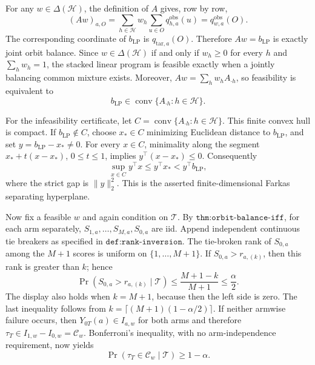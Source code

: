 For any \(w\in\Delta(\mathcal H)\), the definition of \(A\) gives, row by row, \[(Aw)_{a,O}=\sum_{h\in\mathcal H}w_h\sum_{u\in O}q^{\mathrm{obs}}_{h,a}(u)=q^{\mathrm{obs}}_{w,a}(O).\] The corresponding coordinate of \(b_{\mathrm{LP}}\) is \(q_{\mathrm{tar},a}(O)\). Therefore \(Aw=b_{\mathrm{LP}}\) is exactly joint orbit balance. Since \(w\in\Delta(\mathcal H)\) if and only if \(w_h\ge0\) for every \(h\) and \(\sum_h w_h=1\), the stacked linear program is feasible exactly when a jointly balancing common mixture exists. Moreover, \(Aw=\sum_h w_hA_{\cdot h}\), so feasibility is equivalent to \[b_{\mathrm{LP}}\in\operatorname{conv}\{A_{\cdot h}:h\in\mathcal H\}.\]

For the infeasibility certificate, let \(C=\operatorname{conv}\{A_{\cdot h}:h\in\mathcal H\}\). This finite convex hull is compact. If \(b_{\mathrm{LP}}\notin C\), choose \(x_*\in C\) minimizing Euclidean distance to \(b_{\mathrm{LP}}\), and set \(y=b_{\mathrm{LP}}-x_*\ne0\). For every \(x\in C\), minimality along the segment \(x_*+t(x-x_*)\), \(0\le t\le1\), implies \(y^\top(x-x_*)\le0\). Consequently \[\sup_{x\in C}y^\top x\le y^\top x_*<y^\top b_{\mathrm{LP}},\] where the strict gap is \(\lVert y\rVert_2^2\). This is the asserted finite-dimensional Farkas separating hyperplane.

Now fix a feasible \(w\) and again condition on \(\mathcal T\). By \(\texttt{thm:orbit-balance-iff}\), for each arm separately, \(S_{1,a},\ldots,S_{M,a},S_{0,a}\) are iid. Append independent continuous tie breakers as specified in \(\texttt{def:rank-inversion}\). The tie-broken rank of \(S_{0,a}\) among the \(M+1\) scores is uniform on \(\{1,\ldots,M+1\}\). If \(S_{0,a}>r_{a,(k)}\), then this rank is greater than \(k\); hence \[\Pr(S_{0,a}>r_{a,(k)}\mid\mathcal T)\le\frac{M+1-k}{M+1}\le\frac{\alpha}{2}.\] The display also holds when \(k=M+1\), because then the left side is zero. The last inequality follows from \(k=\lceil(M+1)(1-\alpha/2)\rceil\). If neither armwise failure occurs, then \(Y_{0T}(a)\in I_{a,w}\) for both arms and therefore \(\tau_T\in I_{1,w}-I_{0,w}=\mathcal C_w\). Bonferroni's inequality, with no arm-independence requirement, now yields \[\Pr(\tau_T\in\mathcal C_w\mid\mathcal T)\ge1-\alpha.\]